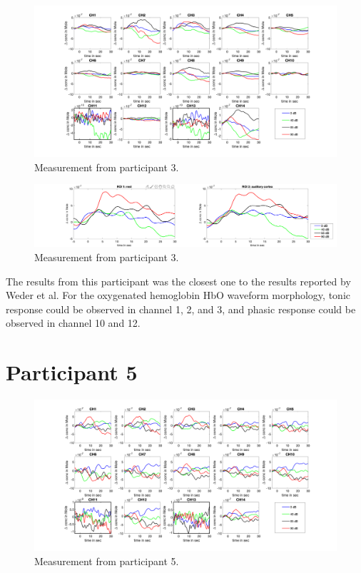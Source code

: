 \begin{figure}[H]
  \centering
    \includegraphics[scale=.4]{bilder/HbR_Mole/sub_jonas_s_HbR.png}
  \caption{Measurement from participant 3.}
  \label{fig:somesignal}
\end{figure}

\begin{figure}[H]
  \centering
    \includegraphics[scale=.3]{bilder/ROI/sub_jonas_s_HbO.png}
  \caption{Measurement from participant  3.}
\end{figure}

The results from this participant was the closest one to the results reported by Weder et al. For the oxygenated hemoglobin HbO waveform morphology, tonic response could be observed in channel 1, 2, and 3, and phasic response could be observed in channel 10 and 12.

\newpage





\section {Participant 5}
\begin{figure}[H]
  \centering
    \includegraphics[scale=.4]{bilder/HbO_Mole/sub_lukas_s_HbO.png}
  \caption{Measurement from participant 5.}
  \label{fig:somesignal}
\end{figure}

